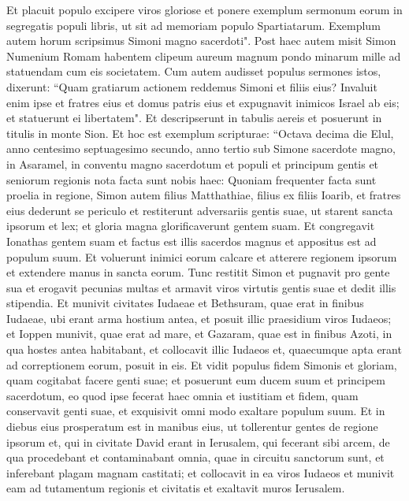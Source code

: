 \begin{biblechapter}
\verse Et placuit populo excipere viros gloriose et ponere exemplum sermonum eorum in segregatis populi libris, ut sit ad memoriam populo Spartiatarum. Exemplum autem horum scripsimus Simoni magno sacerdoti". 
\verse Post haec autem misit Simon Numenium Romam habentem clipeum aureum magnum pondo minarum mille ad statuendam cum eis societatem. 
\verse Cum autem audisset populus sermones istos, dixerunt: “Quam gratiarum actionem reddemus Simoni et filiis eius? 
\verse Invaluit enim ipse et fratres eius et domus patris eius et expugnavit inimicos Israel ab eis; et statuerunt ei libertatem". Et descripserunt in tabulis aereis et posuerunt in titulis in monte Sion. 
\verse Et hoc est exemplum scripturae: “Octava decima die Elul, anno centesimo septuagesimo secundo, anno tertio sub Simone sacerdote magno, in Asaramel, 
\verse in conventu magno sacerdotum et populi et principum gentis et seniorum regionis nota facta sunt nobis haec: 
\verse Quoniam frequenter facta sunt proelia in regione, Simon autem filius Matthathiae, filius ex filiis Ioarib, et fratres eius dederunt se periculo et restiterunt adversariis gentis suae, ut starent sancta ipsorum et lex; et gloria magna glorificaverunt gentem suam. 
\verse Et congregavit Ionathas gentem suam et factus est illis sacerdos magnus et appositus est ad populum suum. 
\verse Et voluerunt inimici eorum calcare et atterere regionem ipsorum et extendere manus in sancta eorum. 
\verse Tunc restitit Simon et pugnavit pro gente sua et erogavit pecunias multas et armavit viros virtutis gentis suae et dedit illis stipendia. 
\verse Et munivit civitates Iudaeae et Bethsuram, quae erat in finibus Iudaeae, ubi erant arma hostium antea, et posuit illic praesidium viros Iudaeos; 
\verse et Ioppen munivit, quae erat ad mare, et Gazaram, quae est in finibus Azoti, in qua hostes antea habitabant, et collocavit illic Iudaeos et, quaecumque apta erant ad correptionem eorum, posuit in eis. 
\verse Et vidit populus fidem Simonis et gloriam, quam cogitabat facere genti suae; et posuerunt eum ducem suum et principem sacerdotum, eo quod ipse fecerat haec omnia et iustitiam et fidem, quam conservavit genti suae, et exquisivit omni modo exaltare populum suum.  
\verse Et in diebus eius prosperatum est in manibus eius, ut tollerentur gentes de regione ipsorum et, qui in civitate David erant in Ierusalem, qui fecerant sibi arcem, de qua procedebant et contaminabant omnia, quae in circuitu sanctorum sunt, et inferebant plagam magnam castitati; 
\verse et collocavit in ea viros Iudaeos et munivit eam ad tutamentum regionis et civitatis et exaltavit muros Ierusalem. 

\end{biblechapter}
